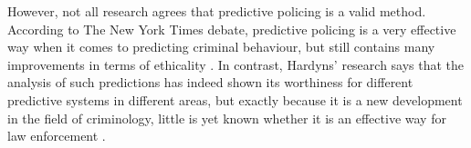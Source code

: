 However, not all research agrees that predictive policing is a valid method. According to The New York Times debate, predictive policing is a very effective way when it comes to predicting criminal behaviour, but still contains many improvements in terms of ethicality \cite{karppi}. In contrast, Hardyns' research says that the analysis of such predictions has indeed shown its worthiness for different predictive systems in different areas, but exactly because it is a new development in the field of criminology, little is yet known whether it is an effective way for law enforcement \cite{hardyns}.

